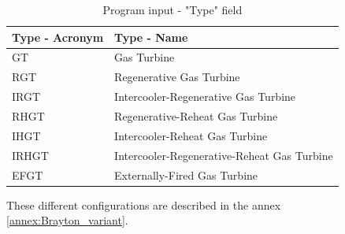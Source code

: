 \begin{longtable}[c]{ll}
\caption{Program input - "Type" field}
\label{tab:C6_inputconfig}\\
\toprule
\textbf{Type - Acronym} & \textbf{Type - Name}                   \\* \midrule
\endfirsthead
%
\endhead
%
\bottomrule
\endfoot
%
\endlastfoot
%
GT                           & Gas Turbine                                 \\
RGT                          & Regenerative Gas Turbine                    \\
IRGT                         & Intercooler-Regenerative Gas Turbine        \\
RHGT                         & Regenerative-Reheat Gas Turbine             \\
IHGT                         & Intercooler-Reheat Gas Turbine              \\
IRHGT                        & Intercooler-Regenerative-Reheat Gas Turbine \\
EFGT                         & Externally-Fired Gas Turbine                \\* \bottomrule
\end{longtable}

These different configurations are described in the annex \ref{annex:Brayton_variant}. 

